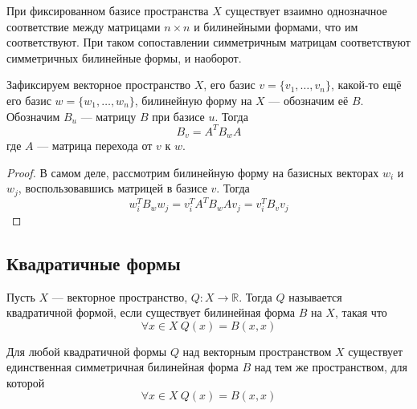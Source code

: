 \documentclass[11pt]{article}
\begin{document}
    \begin{remark}
    При фиксированном базисе пространства $X$ существует взаимно однозначное соответствие между матрицами $n \times n$ и билинейными формами, что им соответствуют. При таком сопоставлении симметричным матрицам соответствуют симметричных билинейные формы, и наоборот.
    \end{remark}

    \vspace{15pt}

    Зафиксируем векторное пространство $X$, его базис $v = \{v_1, \hdots, v_n\}$, какой-то ещё его базис $w = \{w_1, \hdots, w_n\}$, билинейную форму на $X$ --- обозначим её $B$. Обозначим $B_u$ --- матрицу $B$ при базисе $u$. Тогда
    \begin{equation*}
        B_v = A^{T} B_w A
    \end{equation*}
    где $A$ --- матрица перехода от $v$ к $w$.

    \begin{proof}
    В самом деле, рассмотрим билинейную форму на базисных векторах $w_i$ и $w_j$, воспользовавшись матрицей в базисе $v$. Тогда
    \begin{equation*}
        w_i^{T} B_w w_j = v_{i}^{T} A^T B_w A v_j = v_{i}^{T} B_v v_{j}
    \end{equation*}
    \end{proof}

    \newpage

    \subsection{Квадратичные формы}

    \begin{definition}
    Пусть $X$ --- векторное пространство, $Q: X \to \mathbb{R}$. Тогда $Q$ называется квадратичной формой, если существует билинейная форма $B$ на $X$, такая что
    \begin{equation*}
        \forall x \in X \ Q(x) = B(x, x)
    \end{equation*}
    \end{definition}

    \begin{theorem}
    Для любой квадратичной формы $Q$ над векторным пространством $X$ существует единственная симметричная билинейная форма $B$ над тем же пространством, для которой
    \begin{equation*}
        \forall x \in X \ Q(x) = B(x, x)
    \end{equation*}
    \end{theorem}
\end{document}
